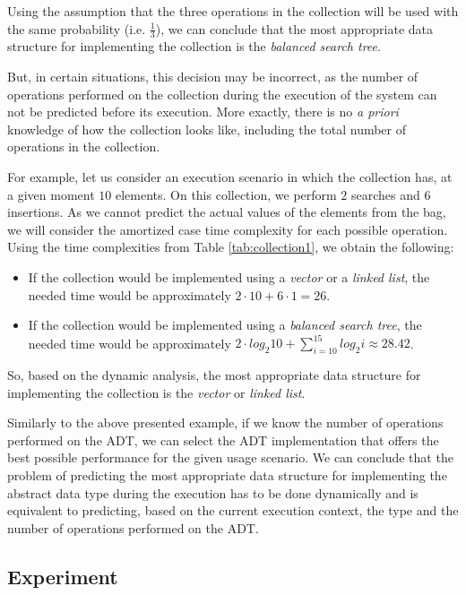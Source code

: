 Using the assumption that the three operations in the collection will be used with the same probability (i.e. $\frac{1}{3}$), we can conclude that the most appropriate data structure for implementing the collection is the \emph{balanced search tree}.

But, in certain situations, this decision may be incorrect, as the number of operations performed on the collection during the execution of the system can not be predicted before its execution. More exactly, there is no \emph{a priori} knowledge of how the collection looks like, including the total number of operations in the collection.

For example, let us consider an execution scenario in which the collection has, at a given moment $10$ elements. On this collection, we perform $2$ searches and $6$ insertions. As we cannot predict the actual values of the elements from the bag, we will consider the amortized case time complexity for each possible operation. Using the time complexities from Table \ref{tab:collection1}, we obtain the following:

\begin{itemize}

\item If the collection would be implemented using a \emph{vector} or a \emph{linked list}, the needed time would be approximately $2 \cdot 10 + 6 \cdot 1=26$.

\item If the collection would be implemented using a \emph{balanced search tree}, the needed time would be approximately $ 2 \cdot log_2{10} + \sum \limits_{i=10}^{15}{log_{2}i} \approx 28.42 $.

\end{itemize}

So, based on the dynamic analysis, the most appropriate data structure for implementing the collection is the \emph{vector} or \emph{linked list}.

Similarly to the above presented example, if we know the number of operations performed on the ADT, we can select the ADT implementation that offers the best possible performance for the given usage scenario. We can conclude that the problem of predicting the most appropriate data structure for implementing the abstract data type during the execution has to be done dynamically and is equivalent to predicting, based on the current execution context, the type and the number of operations performed on the ADT.

\subsection{Experiment}

